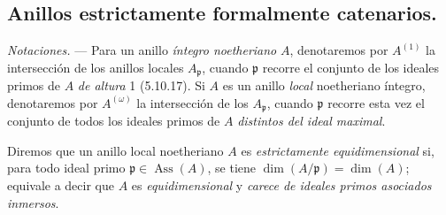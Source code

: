 \subsection{Anillos estrictamente formalmente catenarios.}
\label{subsection:IV.7.2-fr}

\begin{env}[7.2.1]
\label{IV.2.s7.2.1-fr}
\emph{Notaciones.} --- Para un anillo \emph{íntegro noetheriano} $A$, denotaremos
por $A^{(1)}$ la intersección de los anillos locales $A_{\mathfrak p}$,
cuando $\mathfrak p$ recorre el conjunto de los ideales primos de $A$ \emph{de
altura} 1 (5.10.17). Si $A$ es un anillo \emph{local} noetheriano íntegro,
denotaremos por $A^{(\omega)}$ la intersección de los $A_{\mathfrak p}$,
cuando $\mathfrak p$ recorre esta vez el conjunto de todos los ideales
primos de $A$ \emph{distintos del ideal maximal}.

Diremos que un anillo local noetheriano $A$ es \emph{estrictamente
equidimensional} si, para todo ideal primo
$\mathfrak p\in\operatorname{Ass}(A)$, se tiene
$\dim(A/\mathfrak p)=\dim(A)$; equivale a decir que $A$ es
\emph{equidimensional} y \emph{carece de ideales primos asociados inmersos}.
\end{env}
